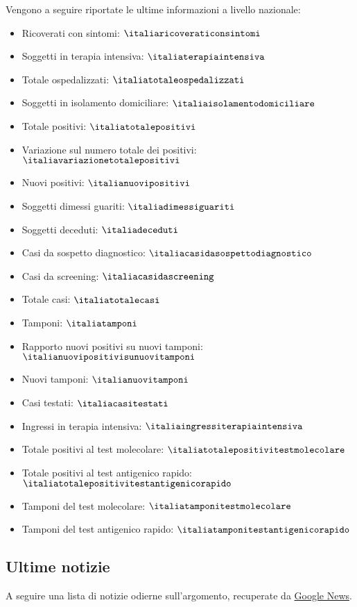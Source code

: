 \documentclass[12pt]{article}
\begin{document}
Vengono a seguire riportate le ultime informazioni a livello nazionale:
\begin{itemize}
	\item Ricoverati con sintomi: $\italiaricoveraticonsintomi$
	\item Soggetti in terapia intensiva: $\italiaterapiaintensiva$
	\item Totale ospedalizzati: $\italiatotaleospedalizzati$
	\item Soggetti in isolamento domiciliare: $\italiaisolamentodomiciliare$
	\item Totale positivi: $\italiatotalepositivi$
	\item Variazione sul numero totale dei positivi: $\italiavariazionetotalepositivi$
	\item Nuovi positivi: $\italianuovipositivi$
	\item Soggetti dimessi guariti: $\italiadimessiguariti$
	\item Soggetti deceduti: $\italiadeceduti$
	\item Casi da sospetto diagnostico: $\italiacasidasospettodiagnostico$
	\item Casi da screening: $\italiacasidascreening$
	\item Totale casi: $\italiatotalecasi$
	\item Tamponi: $\italiatamponi$
	\item Rapporto nuovi positivi su nuovi tamponi: $\italianuovipositivisunuovitamponi$
	\item Nuovi tamponi: $\italianuovitamponi$
	\item Casi testati: $\italiacasitestati$
	\item Ingressi in terapia intensiva: $\italiaingressiterapiaintensiva$
	\item Totale positivi al test molecolare: $\italiatotalepositivitestmolecolare$
	\item Totale positivi al test antigenico rapido: $\italiatotalepositivitestantigenicorapido$
	\item Tamponi del test molecolare: $\italiatamponitestmolecolare$
	\item Tamponi del test antigenico rapido: $\italiatamponitestantigenicorapido$
\end{itemize}

\subsection{Ultime notizie}

A seguire una lista di notizie odierne sull'argomento, recuperate da \href{http://news.google.it}{Google News}.
\begin{itemize}
	
\end{itemize}
\end{document}
